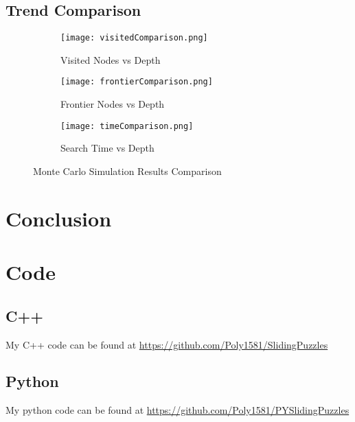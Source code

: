 \documentclass{article}
\begin{document}
\subsection{Trend Comparison}\begin{figure}[ht]
	\centering
	\begin{subfigure}[b]{0.32\textwidth}
		\centering
		\texttt{[image: visitedComparison.png]}
		\caption{Visited Nodes vs Depth}
		\label{fig:Visited Nodes Comparison}
	\end{subfigure}
	\hfill
	\begin{subfigure}[b]{0.32\textwidth}
		\centering
		\texttt{[image: frontierComparison.png]}
		\caption{Frontier Nodes vs Depth}
		\label{fig:Frontier Comparison}
	\end{subfigure}
	\hfill
	\begin{subfigure}[b]{0.32\textwidth}
		\centering
		\texttt{[image: timeComparison.png]}
		\caption{Search Time vs Depth}
		\label{fig:Search Time Comparison}
	\end{subfigure}
	\caption{Monte Carlo Simulation Results Comparison}
	\label{fig:Monte Carlo Simulation Comparison}
\end{figure}
\section{Conclusion}
\section{Code}
\subsection{C++}
My C++ code can be found at \url{https://github.com/Poly1581/SlidingPuzzles}
\subsection{Python}
My python code can be found at \url{https://github.com/Poly1581/PYSlidingPuzzles}
\end{document}
